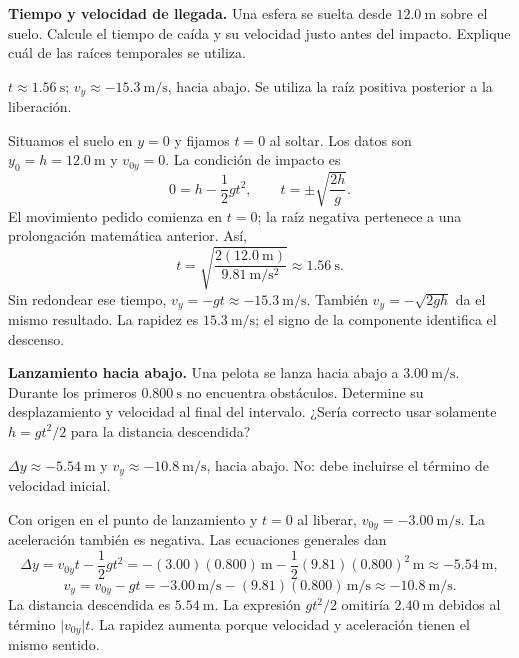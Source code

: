 \begin{ejercicio}
\textbf{Tiempo y velocidad de llegada.} Una esfera se suelta desde \(\SI{12.0}{\meter}\) sobre el suelo. Calcule el tiempo de caída y su velocidad justo antes del impacto. Explique cuál de las raíces temporales se utiliza.
\end{ejercicio}
\begin{respuesta}
\(t\approx\SI{1.56}{\second}\); \(v_y\approx-\SI{15.3}{\meter\per\second}\), hacia abajo. Se utiliza la raíz positiva posterior a la liberación.
\end{respuesta}
\begin{explicacion}
Situamos el suelo en \(y=0\) y fijamos \(t=0\) al soltar. Los datos son \(y_0=h=\SI{12.0}{\meter}\) y \(v_{0y}=0\). La condición de impacto es
\[ 0=h-\frac12gt^2,\qquad t=\pm\sqrt{\frac{2h}{g}}. \]
El movimiento pedido comienza en \(t=0\); la raíz negativa pertenece a una prolongación matemática anterior. Así,
\[ t=\sqrt{\frac{2(\SI{12.0}{\meter})}{\SI{9.81}{\meter\per\second\squared}}}\approx\SI{1.56}{\second}. \]
Sin redondear ese tiempo, \(v_y=-gt\approx-\SI{15.3}{\meter\per\second}\). También \(v_y=-\sqrt{2gh}\) da el mismo resultado. La rapidez es \(\SI{15.3}{\meter\per\second}\); el signo de la componente identifica el descenso.
\end{explicacion}

\begin{ejercicio}
\textbf{Lanzamiento hacia abajo.} Una pelota se lanza hacia abajo a \(\SI{3.00}{\meter\per\second}\). Durante los primeros \(\SI{0.800}{\second}\) no encuentra obstáculos. Determine su desplazamiento y velocidad al final del intervalo. ¿Sería correcto usar solamente \(h=gt^2/2\) para la distancia descendida?
\end{ejercicio}
\begin{respuesta}
\(\Delta y\approx-\SI{5.54}{\meter}\) y \(v_y\approx-\SI{10.8}{\meter\per\second}\), hacia abajo. No: debe incluirse el término de velocidad inicial.
\end{respuesta}
\begin{explicacion}
Con origen en el punto de lanzamiento y \(t=0\) al liberar, \(v_{0y}=-\SI{3.00}{\meter\per\second}\). La aceleración también es negativa. Las ecuaciones generales dan
\[ \Delta y=v_{0y}t-\frac12gt^2=-(3.00)(0.800)\,\si{\meter}-\frac12(9.81)(0.800)^2\,\si{\meter}\approx-\SI{5.54}{\meter}, \]
\[ v_y=v_{0y}-gt=-3.00\,\si{\meter\per\second}-(9.81)(0.800)\,\si{\meter\per\second}\approx-\SI{10.8}{\meter\per\second}. \]
La distancia descendida es \(\SI{5.54}{\meter}\). La expresión \(gt^2/2\) omitiría \(\SI{2.40}{\meter}\) debidos al término \(\lvert v_{0y}\rvert t\). La rapidez aumenta porque velocidad y aceleración tienen el mismo sentido.
\end{explicacion}

